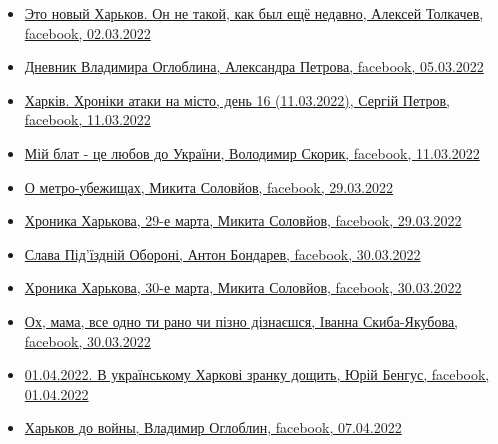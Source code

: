 \begin{itemize} %

\item \hyperlink{02_03_2022.fb.tolkachev_aleksej.1.novyj_harkov}{
Это новый Харьков. Он не такой, как был ещё недавно, Алексей Толкачев, facebook, 02.03.2022%
}

\item \hyperlink{05_03_2022.fb.petrova_aleksandra.1.dnevnik_ogloblin}{%
Дневник Владимира Оглоблина, Александра Петрова, facebook, 05.03.2022%
}

\item \hyperlink{11_03_2022.fb.petrov_sergij.harkiv.1.hroniki}{%
Харків. Хроніки атаки на місто, день 16 (11.03.2022), Сергій Петров, facebook, 11.03.2022%
}

\item \hyperlink{11_03_2022.fb.skoryk_volodymyr.harkiv.1.blat_lubov_do_ukrainy}{%
Мій блат - це любов до України, Володимир Скорик, facebook, 11.03.2022%
}

\item \hyperlink{29_03_2022.fb.solovjov_mikita.harkov.demsokyra.2.o_metro_ubezhischah}{%
О метро-убежищах, Микита Соловйов, facebook, 29.03.2022%
}

\item \hyperlink{29_03_2022.fb.solovjov_mikita.harkov.demsokyra.1.hronika}{%
Хроника Харькова, 29-е марта, Микита Соловйов, facebook, 29.03.2022%
}

\item \hyperlink{30_03_2022.fb.bondarev_anton.harkiv.1.slava_oboroni_podjezd}{%
Слава Під'їздній Обороні, Антон Бондарев, facebook, 30.03.2022%
}

\item \hyperlink{30_03_2022.fb.solovjov_mikita.harkov.demsokyra.1.hronika}{%
Хроника Харькова, 30-е марта, Микита Соловйов, facebook, 30.03.2022%
}

\item \hyperlink{30_03_2022.fb.skyba_jakubova_ivanna.harkiv.1.mama}{%
Ох, мама, все одно ти рано чи пізно дізнаєшся, Іванна Скиба-Якубова, facebook, 30.03.2022%
}

\item \hyperlink{01_04_2022.fb.bengus_jurij.1.ukr_harkov_dosch}{%
01.04.2022. В українському Харкові зранку дощить, Юрій Бенгус, facebook, 01.04.2022%
}

\item \hyperlink{07_04_2022.fb.ogloblin_vladimir.harkov.1.harkov_do_vojny}{%
Харьков до войны, Владимир Оглоблин, facebook, 07.04.2022%
}


\end{itemize}
